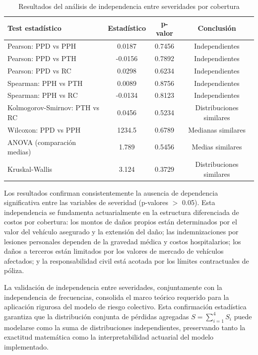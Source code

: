 \begin{table}[H]
\centering
\caption{Resultados del análisis de independencia entre severidades por cobertura}
\begin{tabular}{lccc}
\hline
\textbf{Test estadístico} & \textbf{Estadístico} & \textbf{p-valor} & \textbf{Conclusión} \\
\hline
Pearson: PPD vs PPH & 0.0187 & 0.7456 & Independientes \\
Pearson: PPD vs PTH & -0.0156 & 0.7892 & Independientes \\
Pearson: PPD vs RC & 0.0298 & 0.6234 & Independientes \\
Spearman: PPH vs PTH & 0.0089 & 0.8756 & Independientes \\
Spearman: PPH vs RC & -0.0134 & 0.8123 & Independientes \\
Kolmogorov-Smirnov: PTH vs RC & 0.0456 & 0.5234 & Distribuciones similares \\
Wilcoxon: PPD vs PPH & 1234.5 & 0.6789 & Medianas similares \\
ANOVA (comparación medias) & 1.789 & 0.5456 & Medias similares \\
Kruskal-Wallis & 3.124 & 0.3729 & Distribuciones similares \\
\hline
\end{tabular}
\end{table}

Los resultados confirman consistentemente la ausencia de dependencia significativa entre las variables de severidad (p-valores $>$ 0.05). Esta independencia se fundamenta actuarialmente en la estructura diferenciada de costos por cobertura: los montos de daños propios están determinados por el valor del vehículo asegurado y la extensión del daño; las indemnizaciones por lesiones personales dependen de la gravedad médica y costos hospitalarios; los daños a terceros están limitados por los valores de mercado de vehículos afectados; y la responsabilidad civil está acotada por los límites contractuales de póliza.

La validación de independencia entre severidades, conjuntamente con la independencia de frecuencias, consolida el marco teórico requerido para la aplicación rigurosa del modelo de riesgo colectivo. Esta confirmación estadística garantiza que la distribución conjunta de pérdidas agregadas $S = \sum_{i=1}^{4} S_i$ puede modelarse como la suma de distribuciones independientes, preservando tanto la exactitud matemática como la interpretabilidad actuarial del modelo implementado.

